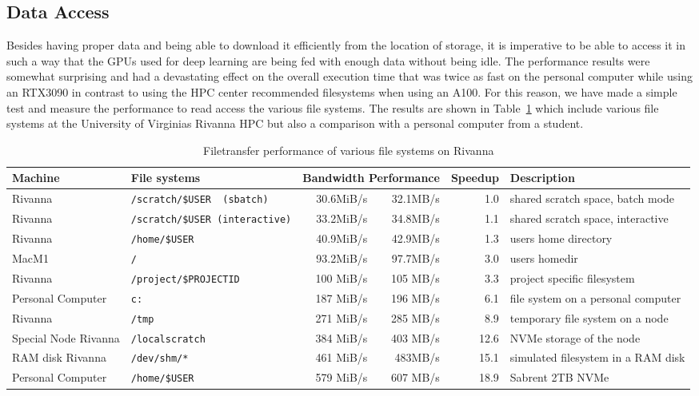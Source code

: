 \documentclass[utf8]{FrontiersinVancouver} %
\begin{document}
\subsection{Data Access}

Besides having proper data and being able to download it efficiently
from the location of storage, it is imperative to be able to access it
in such a way that the GPUs used for deep learning are being fed with
enough data without being idle. The performance results were somewhat
surprising and had a devastating effect on the overall execution time
that was twice as fast on the personal computer while using an
RTX3090 in contrast to using the HPC center recommended filesystems
when using an A100. For this reason, we have made a simple test and
measure the performance to read access the various file systems. The
results are shown in Table~\ref{tab:file-performance} which include
various file systems at the University of Virginias Rivanna HPC but also a
comparison with a personal computer from a student.

\begin{table}[htb]
  \caption{Filetransfer performance of various file systems on Rivanna}
  \label{tab:file-performance}
  \begin{center}
  {\footnotesize 
  \begin{tabular}{llrrrp{4.5cm}}
    Machine & File systems & \multicolumn{2}{l}{Bandwidth Performance} & Speedup & Description \\
    \hline
    Rivanna & \verb|/scratch/$USER  (sbatch)|     & 30.6MiB/s & 32.1MB/s  & 1.0 & shared scratch space, batch mode \\
    Rivanna & \verb|/scratch/$USER (interactive)| & 33.2MiB/s &  34.8MB/s  & 1.1 & shared scratch space, interactive \\
    Rivanna & \verb|/home/$USER|                    & 40.9MiB/s & 42.9MB/s  & 1.3 & users home directory \\
    MacM1   & \verb|/| & 93.2MiB/s & 97.7MB/s & 3.0 & users homedir \\
    Rivanna & \verb|/project/$PROJECTID |     & 100 MiB/s  & 105 MB/s  & 3.3 & project specific filesystem \\
    Personal Computer  & \verb|c:| & 187 MiB/s  & 196 MB/s  & 6.1 &  file system on a personal computer \\
    Rivanna & \verb|/tmp|                         & 271 MiB/s  & 285 MB/s  & 8.9 & temporary file system on a node \\
    \hline
    Special Node Rivanna & \verb|/localscratch|  &  384 MiB/s & 403 MB/s  & 12.6 & NVMe storage of the node\\
    RAM disk Rivanna  & \verb|/dev/shm/*|      &             461 MiB/s & 483MB/s  & 15.1 & simulated filesystem in a RAM disk\\
    Personal Computer & \verb|/home/$USER| & 579 MiB/s & 607 MB/s &  18.9 & Sabrent 2TB NVMe\\
    \hline                                             
    \end{tabular}
  }
    \end{center}
  \end{table}
  
\end{document}
